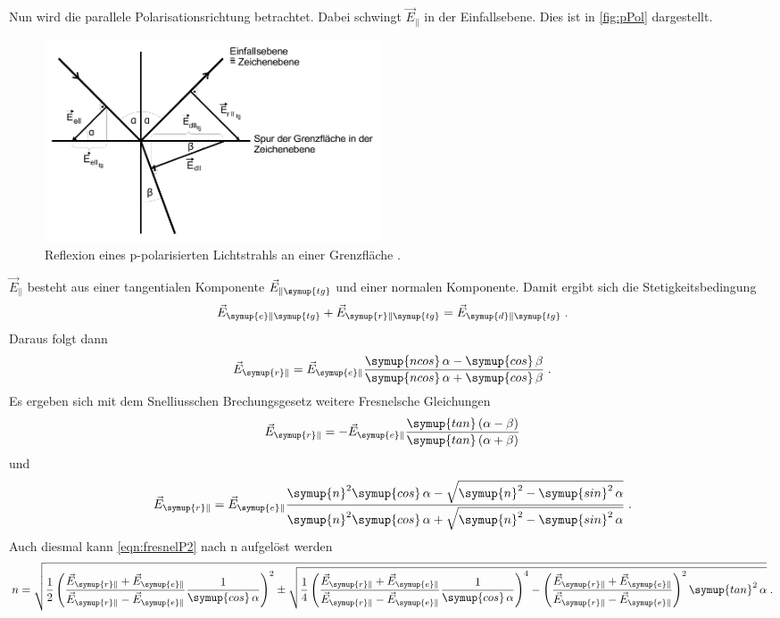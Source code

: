 Nun wird die parallele Polarisationsrichtung betrachtet. Dabei schwingt $\vec{E}_{\|}$ in der Einfallsebene. Dies ist in \autoref{fig:pPol} dargestellt.
\begin{figure}
    \centering
    \includegraphics[height = 6cm]{pPol.pdf}
    \caption{Reflexion eines p-polarisierten Lichtstrahls an einer Grenzfläche \cite{ap407}.}
    \label{fig:pPol}
\end{figure}
$\vec{E}_{\|}$ besteht aus einer tangentialen Komponente $\vec{E}_{\| \symup{tg}}$ und einer normalen Komponente. Damit ergibt sich die Stetigkeitsbedingung 
\begin{equation*}
    \vec{E}_{\symup{e}\|\symup{tg}} + \vec{E}_{\symup{r}\|\symup{tg}} = \vec{E}_{\symup{d}\|\symup{tg}} \; .
\end{equation*}
Daraus folgt dann
\begin{equation*}
    \vec{E}_{\symup{r}\|} = \vec{E}_{\symup{e}\|} \frac{\symup{ncos}\, \alpha- \symup{cos}\, \beta}{\symup{ncos}\, \alpha + \symup{cos}\,\beta} \; .
\end{equation*}
Es ergeben sich mit dem Snelliusschen Brechungsgesetz weitere Fresnelsche Gleichungen
\begin{equation}
    \vec{E}_{\symup{r}\|} = - \vec{E}_{\symup{e}\|} \frac{\symup{tan}\left(\alpha - \beta\right)}{\symup{tan}\left(\alpha + \beta\right)}
    \label{eqn:fresnelP1}
\end{equation}
und
\begin{equation}
    \vec{E}_{\symup{r}\|} = \vec{E}_{\symup{e}\|}\frac{\symup{n}^2\symup{cos}\, \alpha - \sqrt{\symup{n}^2-\symup{sin}^2\,\alpha}}{\symup{n}^2\symup{cos}\, \alpha + \sqrt{\symup{n}^2-\symup{sin}^2\,\alpha}} \; .
    \label{eqn:fresnelP2}
\end{equation}
Auch diesmal kann \autoref{eqn:fresnelP2} nach n aufgelöst werden
\begin{equation*}
    n = \sqrt{\frac{1}{2}\left(\frac{\vec{E}_{\symup{r}\|}+\vec{E}_{\symup{e}\|}}{\vec{E}_{\symup{r}\|}-\vec{E}_{\symup{e}\|}}\frac{1}{\symup{cos}\,\alpha}\right)^2 \pm 
    \sqrt{\frac{1}{4}\left(\frac{\vec{E}_{\symup{r}\|}+\vec{E}_{\symup{e}\|}}{\vec{E}_{\symup{r}\|}-\vec{E}_{\symup{e}\|}}\frac{1}{\symup{cos}\,\alpha}\right)^4 - 
    \left(\frac{\vec{E}_{\symup{r}\|}+\vec{E}_{\symup{e}\|}}{\vec{E}_{\symup{r}\|}-\vec{E}_{\symup{e}\|}}\right)^2 \symup{tan}^2\, \alpha}} \; .
\end{equation*}
